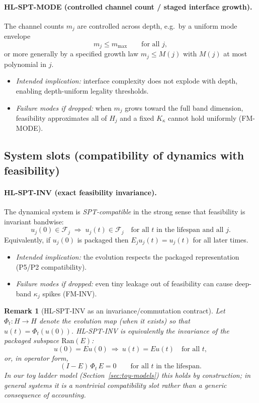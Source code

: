\documentclass[11pt]{article}
\newcommand{\Ran}{\mathrm{Ran}}
\newtheorem{remark}[definition]{Remark}
\begin{document}
\paragraph{\textbf{HL-SPT-MODE} (controlled channel count / staged interface growth).}
The channel counts $m_j$ are controlled across depth, e.g.\ by a uniform mode envelope
\begin{equation}\label{eq:HL-MODE}
m_j \le m_{\max}\qquad\text{for all } j,
\end{equation}
or more generally by a specified growth law $m_j\le M(j)$ with $M(j)$ at most polynomial in $j$.
\begin{itemize}
\item \emph{Intended implication:} interface complexity does not explode with depth, enabling depth-uniform legality thresholds.
\item \emph{Failure modes if dropped:} when $m_j$ grows toward the full band dimension, feasibility approximates all of $H_j$ and a fixed $K_\kappa$ cannot hold uniformly (FM-MODE).
\end{itemize}

\subsection{System slots (compatibility of dynamics with feasibility)}

\paragraph{\textbf{HL-SPT-INV} (exact feasibility invariance).}
The dynamical system is \emph{SPT-compatible} in the strong sense that feasibility is invariant bandwise:
\begin{equation}\label{eq:HL-INV}
u_j(0)\in \mathcal{F}_j \;\Rightarrow\; u_j(t)\in \mathcal{F}_j \quad \text{for all } t \text{ in the lifespan and all } j.
\end{equation}
Equivalently, if $u_j(0)$ is packaged then $E_j u_j(t)=u_j(t)$ for all later times.
\begin{itemize}
\item \emph{Intended implication:} the evolution respects the packaged representation (P5/P2 compatibility).
\item \emph{Failure modes if dropped:} even tiny leakage out of feasibility can cause deep-band $\kappa_j$ spikes (FM-INV).
\end{itemize}

\begin{remark}[HL-SPT-INV as an invariance/commutation contract]\label{rem:inv-contract}
Let $\Phi_t:H\to H$ denote the evolution map (when it exists) so that $u(t)=\Phi_t(u(0))$.
HL-SPT-INV is equivalently the invariance of the packaged subspace $\Ran(E)$:
\[
u(0)=Eu(0)\ \Rightarrow\ u(t)=Eu(t)\quad\text{for all }t,
\]
or, in operator form,
\[
(I-E)\,\Phi_t\,E = 0 \qquad \text{for all } t \text{ in the lifespan.}
\]
In our toy ladder model (Section~\ref{sec:toy-models}) this holds by construction; in general systems it is a nontrivial compatibility slot rather than a generic consequence of accounting.
\end{remark}
\end{document}
